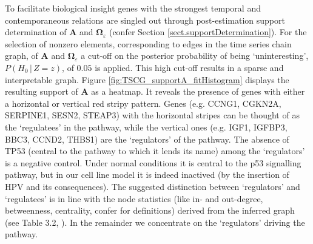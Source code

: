 To facilitate biological insight genes with the strongest temporal and contemporaneous relations are singled out through post-estimation support determination of $\mathbf{A}$ and $\mathbf{\Omega}_{\varepsilon}$ (confer Section \ref{sect.supportDetermination}). For the selection of nonzero elements, corresponding to edges in the time series chain graph, of $\mathbf{A}$ and $\mathbf{\Omega}_{\varepsilon}$ a cut-off on the posterior probability of being `uninteresting', $P(H_0 \, | \, Z=z)$, of $0.05$ is applied. This high cut-off results in a sparse and interpretable graph. Figure \ref{fig:TSCG_supportA_fitHistogram} displays the resulting support of $\mathbf{A}$ as a heatmap. It reveals the presence of genes with either a horizontal or vertical red stripy pattern. Genes (e.g. CCNG1, CGKN2A, SERPINE1, SESN2, STEAP3) with the horizontal stripes can be thought of as the `regulatees' in the pathway, while the vertical ones (e.g. IGF1, IGFBP3, BBC3, CCND2, THBS1) are the `regulators' of the pathway. The absence of TP53 (central to the pathway to which it lends its name) among the `regulators' is a negative control. Under normal conditions it is central to the p53 signalling pathway, but in our cell line model it is indeed inactived (by the insertion of HPV and its consequences). The suggested distinction between `regulators' and `regulatees' is in line with the node statistics (like in- and out-degree, betweenness, centrality, confer \cite{Newman2010} for definitions) derived from the inferred graph (see Table 3.2, \cite{Supp2018}). In the remainder we concentrate on the `regulators' driving the pathway.


